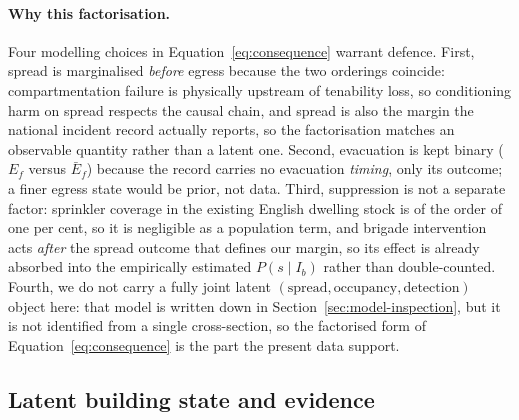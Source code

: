 \paragraph{Why this factorisation.} Four modelling choices in
Equation~\eqref{eq:consequence} warrant defence. First, spread is marginalised
\emph{before} egress because the two orderings coincide: compartmentation failure
is physically upstream of tenability loss, so conditioning harm on spread respects
the causal chain, and spread is also the margin the national incident record
actually reports, so the factorisation matches an observable quantity rather than
a latent one. Second, evacuation is kept binary ($E_f$ versus $\bar E_f$) because
the record carries no evacuation \emph{timing}, only its outcome; a finer egress
state would be prior, not data. Third, suppression is not a separate factor:
sprinkler coverage in the existing English dwelling stock is of the order of one
per cent, so it is negligible as a population term, and brigade intervention acts
\emph{after} the spread outcome that defines our margin, so its effect is already
absorbed into the empirically estimated $P(s\mid I_b)$ rather than double-counted.
Fourth, we do not carry a fully joint latent $(\text{spread},\text{occupancy},
\text{detection})$ object here: that model is written down in
Section~\ref{sec:model-inspection}, but it is not identified from a single
cross-section, so the factorised form of Equation~\eqref{eq:consequence} is the
part the present data support.

\subsection{Latent building state and evidence}


